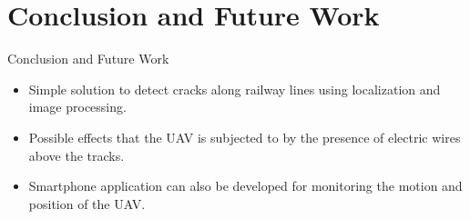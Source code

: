 \section{Conclusion and Future Work}

\begin{frame}{Conclusion and Future Work}
    \begin{itemize}
        \item Simple solution to detect cracks along railway lines using localization and image processing.
        \item Possible effects that the UAV is subjected to by the presence of electric wires above the tracks.
        \item Smartphone application can also be developed for monitoring the motion and position of the UAV.
    \end{itemize}
\end{frame}